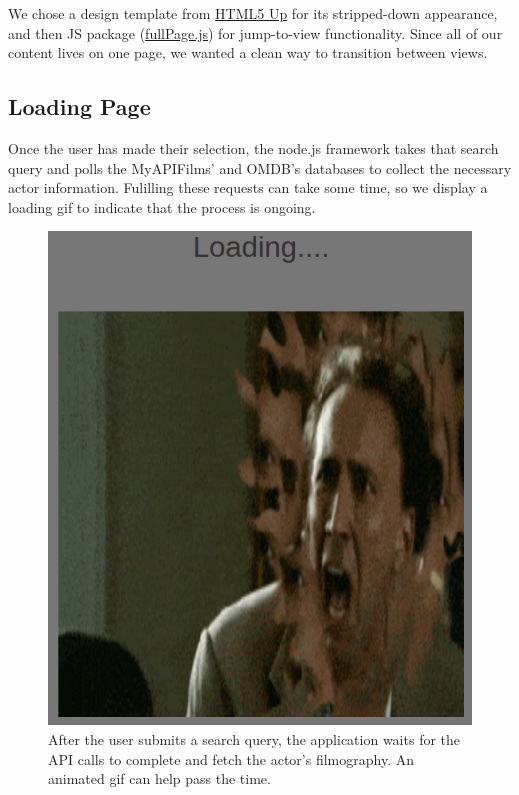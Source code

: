 \documentclass[12pt]{article}
\begin{document}
We chose a design template from \href{http://html5up.net/}{HTML5 Up} for its stripped-down appearance, and then JS package (\href{http://alvarotrigo.com/fullPage/}{fullPage.js}) for jump-to-view functionality.  Since all of our content lives on one page, we wanted a clean way to transition between views.

\subsection{Loading Page}

Once the user has made their selection, the node.js framework takes that search query and polls the MyAPIFilms' and OMDB's databases to collect the necessary actor information.  Fulilling these requests can take some time, so we display a loading gif to indicate that the process is ongoing.

			\begin{figure}[h!]
				\centering
				\includegraphics[scale=0.3]{images/loadingPage.png}
				\caption{After the user submits a search query, the application waits for the API calls to complete and fetch the actor's filmography. An animated gif can help pass the time.}
			\end{figure}
\end{document}
